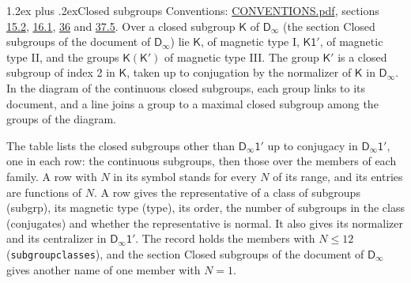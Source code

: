 \documentclass[10pt,a4paper]{article}
\makeatletter
\renewcommand\section{\@startsection{section}{1}{\z@}{-3ex plus -1ex minus -.2ex}%
  {1.2ex plus .2ex}{\normalfont\large\sffamily\bfseries\color{parttitle}}}
\numberwithin{equation}{section}
\newcommand{\grp}[1]{\mathsf{#1}}
\makeatother
\begin{document}
\section{Closed subgroups}\label{s:subgroups}
Conventions: \href{../../CONVENTIONS.pdf}{CONVENTIONS.pdf}, sections \href{../../../rotation/CONVENTIONS.pdf\#conv.15.2}{15.2}, \href{../../../rotation/CONVENTIONS.pdf\#conv.16.1}{16.1}, \href{../../CONVENTIONS.pdf\#conv.36}{36} and \href{../../CONVENTIONS.pdf\#conv.37.5}{37.5}.
\leavevmode\label{n:group.subgroup.point}Over a closed subgroup $\grp{K}$ of $\grp{D_{\infty}}$ (the section Closed subgroups of the document of \href{../../../rotation/data/pdf/Dinf.pdf}{$\grp{D_{\infty}}$}) lie $\grp{K}$, of magnetic type I, $\grp{K1'}$, of magnetic type II, and the groups $\grp{K}(\grp{K}')$ of magnetic type III. The group $\grp{K}'$ is a closed subgroup of index 2 in $\grp{K}$, taken up to conjugation by the normalizer of $\grp{K}$ in $\grp{D_{\infty}}$. In the diagram of the continuous closed subgroups, each group links to its document, and a line joins a group to a maximal closed subgroup among the groups of the diagram.
\begin{center}\end{center}
The table lists the closed subgroups other than $\grp{D_{\infty}1'}$ up to conjugacy in $\grp{D_{\infty}1'}$, one in each row: the continuous subgroups, then those over the members of each family. \label{n:index.family.N}A row with $N$ in its symbol stands for every $N$ of its range, and its entries are functions of $N$. \label{n:head.subgroup}\label{n:head.magnetic.type}\label{n:head.order}\label{n:head.conjugates}\label{n:head.normal}A row gives the representative of a class of subgroups (subgrp), its magnetic type (type), its order, the number of subgroups in the class (conjugates) and whether the representative is normal. \label{n:head.normalizer}\label{n:head.centralizer}It also gives its normalizer and its centralizer in $\grp{D_{\infty}1'}$. The record holds the members with $N \le 12$ (\texttt{subgroupclasses}), and the section Closed subgroups of the document of \href{../../../rotation/data/pdf/Dinf.pdf}{$\grp{D_{\infty}}$} gives another name of one member with $N = 1$.
\end{document}
